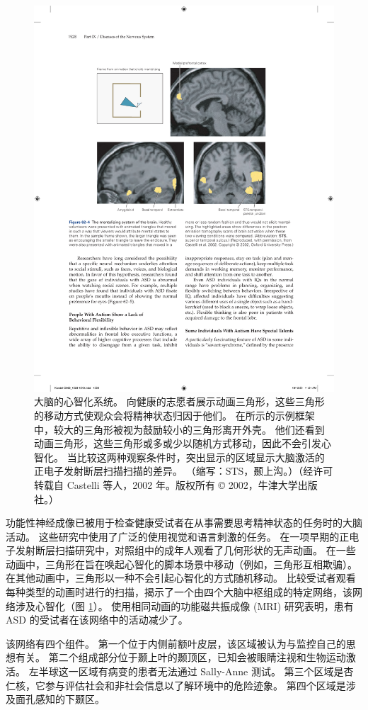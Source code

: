 \begin{figure}[htbp]
	\centering
	\includegraphics[width=0.75\linewidth]{chap62/fig_62_4}
	\caption{大脑的心智化系统。 向健康的志愿者展示动画三角形，这些三角形的移动方式使观众会将精神状态归因于他们。 在所示的示例框架中，较大的三角形被视为鼓励较小的三角形离开外壳。 他们还看到动画三角形，这些三角形或多或少以随机方式移动，因此不会引发心智化。 当比较这两种观察条件时，突出显示的区域显示大脑激活的正电子发射断层扫描扫描的差异。 （缩写：STS，颞上沟。）（经许可转载自 Castelli 等人，2002 年。版权所有 © 2002，牛津大学出版社。）}
	\label{fig:62_4}
\end{figure}

功能性神经成像已被用于检查健康受试者在从事需要思考精神状态的任务时的大脑活动。 这些研究中使用了广泛的使用视觉和语言刺激的任务。 在一项早期的正电子发射断层扫描研究中，对照组中的成年人观看了几何形状的无声动画。 在一些动画中，三角形在旨在唤起心智化的脚本场景中移动（例如，三角形互相欺骗）。 在其他动画中，三角形以一种不会引起心智化的方式随机移动。 比较受试者观看每种类型的动画时进行的扫描，揭示了一个由四个大脑中枢组成的特定网络，该网络涉及心智化（图 \ref{fig:62_4}）。 使用相同动画的功能磁共振成像 (MRI) 研究表明，患有 ASD 的受试者在该网络中的活动减少了。

该网络有四个组件。 第一个位于内侧前额叶皮层，该区域被认为与监控自己的思想有关。 第二个组成部分位于颞上叶的颞顶区，已知会被眼睛注视和生物运动激活。 左半球这一区域有病变的患者无法通过 Sally-Anne 测试。 第三个区域是杏仁核，它参与评估社会和非社会信息以了解环境中的危险迹象。 第四个区域是涉及面孔感知的下颞区。

